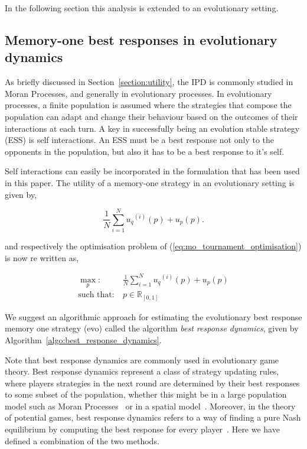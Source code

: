 \documentclass[10pt]{article}
\newcommand{\R}{\mathbb{R}}
\begin{document}
In the following section this analysis is extended to an evolutionary setting.

\subsection{Memory-one best responses in evolutionary dynamics}

As briefly discussed in Section~\ref{section:utility}, the IPD is commonly
studied in Moran Processes, and generally in evolutionary processes. In
evolutionary processes, a finite population is assumed where the strategies that
compose the population can adapt and change their behaviour based on the
outcomes of their interactions at each turn. A key in successfully being an
evolution stable strategy (ESS) is self interactions. An ESS must be a best
response not only to the opponents in the population, but also it has to be a
best response to it's self.

Self interactions can easily be incorporated in the formulation that has been used
in this paper. The utility of a memory-one strategy in an evolutionary setting
is given by,

\begin{equation}
    \frac{1}{N} \sum\limits_{i=1} ^ {N} {u_q}^{(i)} (p) + u_p(p).
\end{equation}

and respectively the optimisation problem of (\ref{eq:mo_tournament_optimisation})
is now re written as,

\begin{equation}\label{eq:mo_evolutionary_optimisation}
    \begin{aligned}
    \max_p: & \ \frac{1}{N} \sum\limits_{i=1} ^ {N} {u_q}^{(i)} (p) + u_p(p)
    \\
    \text{such that}: & \ p \in \R_{[0, 1]}
    \end{aligned}
\end{equation}

We suggest an algorithmic approach for estimating the evolutionary best response memory
one strategy (evo) called the algorithm \textit{best response dynamics}, given
by Algorithm~\ref{algo:best_response_dynamics}.

Note that best response dynamics are commonly used in evolutionary game theory. Best
response dynamics represent a class of strategy updating rules, where players
strategies in the next round are determined by their best responses to some
subset of the population, whether this might be in a large population model
such as Moran Processes~\cite{Knight2018} or in a spatial model~\cite{Nowak1992}.
Moreover, in the theory of potential games, best response dynamics
refers to a way of finding a pure Nash equilibrium by computing the best response for
every player~\cite{Nisan2007}. Here we have defined a combination of the two methods.
\end{document}
